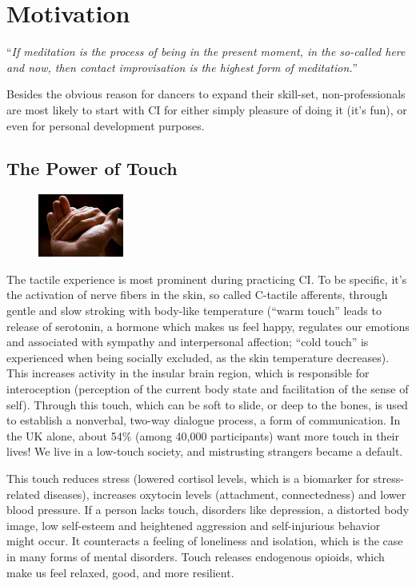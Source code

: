 \section{Motivation}\label{sec:motivation}

``\textit{If meditation is the process of being in the present moment, in the so-called here and now, then contact improvisation is the highest form of meditation.}''

Besides the obvious reason for dancers to expand their skill-set, non-professionals are most likely to start with CI for either simply pleasure of doing it (it's fun), or even for personal development purposes.

\subsection{The Power of Touch}\label{subsec:the-power-of-touch}

\begin{figure}
\centering
\includegraphics[width=0.25\textwidth]{images/motivation}
\end{figure}

The tactile experience is most prominent during practicing CI. To be specific, it's the activation of nerve fibers in the skin, so called C-tactile afferents, through gentle and slow stroking with body-like temperature (``warm touch'' leads to release of serotonin, a hormone which makes us feel happy, regulates our emotions and associated with sympathy and interpersonal affection; ``cold touch'' is experienced when being socially excluded, as the skin temperature decreases).
This increases activity in the insular brain region, which is responsible for interoception (perception of the current body state and facilitation of the sense of self).
Through this touch, which can be soft to slide, or deep to the bones, is used to establish a nonverbal, two-way dialogue process, a form of communication.
In the UK alone, about 54\% (among 40,000 participants) want more touch in their lives!
We live in a low-touch society, and mistrusting strangers became a default.

This touch reduces stress (lowered cortisol levels, which is a biomarker for stress-related diseases), increases oxytocin levels (attachment, connectedness) and lower blood pressure.
If a person lacks touch, disorders like depression, a distorted body image, low self-esteem and heightened aggression and self-injurious behavior might occur.
It counteracts a feeling of loneliness and isolation, which is the case in many forms of mental disorders.
Touch releases endogenous opioids, which make us feel relaxed, good, and more resilient.


